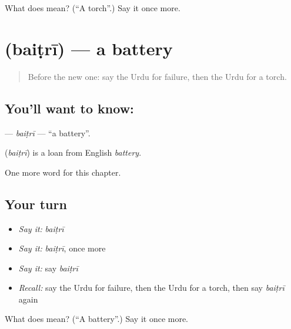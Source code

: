 \begin{tcolorbox}[breakable,colback=teal!4,colframe=teal!35!black,title={Before you move on}]
What does  mean? (\textquotedblleft{}A torch\textquotedblright{}.) Say it once more.
\end{tcolorbox}
\section[\texorpdfstring{\ur{بیٹری} (baiṭrī)}{بیٹری (baiṭrī)}]{ (baiṭrī) — a battery}

\label{lesson:UR-C232-baitri}



\begin{quote}
Before the new one: say the Urdu for failure, then the Urdu for a torch.
\end{quote}

\subsection*{You'll want to know: }
\textbf{} — \emph{baiṭrī} — \textquotedblleft{}a battery\textquotedblright{}.

\begin{cousinweb}
\textbf{} (\emph{baiṭrī}) is a loan from English \emph{battery}.
\end{cousinweb}

\begin{grammarlens}[title={What you've built}]
One more word for this chapter.
\end{grammarlens}

\subsection*{Your turn}
\begin{itemize}
\raggedright
  \item \emph{Say it:} \emph{baiṭrī}
  \item \emph{Say it:} \emph{baiṭrī}, once more
  \item \emph{Say it:} say \emph{baiṭrī}
  \item \emph{Recall:} say the Urdu for failure, then the Urdu for a torch, then say \emph{baiṭrī} again
\end{itemize}

\begin{tcolorbox}[breakable,colback=teal!4,colframe=teal!35!black,title={Before you move on}]
What does  mean? (\textquotedblleft{}A battery\textquotedblright{}.) Say it once more.
\end{tcolorbox}
